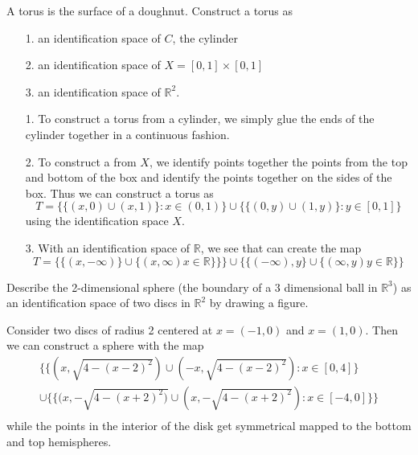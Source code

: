 \documentclass[letter,12pt,twoside]{hmcpset}
\begin{document}
\begin{exercise}[Exercise 8.45]
A torus is the surface of a doughnut. Construct a torus as

\begin{itemize}
    \item[1.] an identification space of $C$, the cylinder
    \item[2.] an identification space of $X = [0, 1] \times [0, 1]$
    \item[3.] an identification space of $\mathbb{R}^2$. 
\end{itemize}
\end{exercise}

\begin{solution}
    \begin{itemize}
        \item[1.] To construct a torus from a cylinder, we simply glue the
        ends of the cylinder together in a continuous fashion.
    
        \item[2.] To construct a from $X$, we identify points together the
        points from the top and bottom of the box and identify the points
        together on the sides of the box. Thus we can construct a torus as
        \[
          T =  \Big\{ \{(x, 0) \cup (x, 1)\} : x \in (0, 1)  \Big\}
          \cup\Big\{ \{(0, y) \cup (1, y)\} : y \in [0, 1] \Big\} 
        \]
        using the identification space $X$.
    
        \item[3.] With an identification space of $\mathbb{R}$, we see
        that can create the map
        \[
            T = \Big\{ \{(x, -\infty)\}\cup \{(x,\infty) x \in \mathbb{R}\}\}\Big\}
            \cup \Big\{ \{(-\infty), y\}\cup \{(\infty, y) y \in \mathbb{R}\}\Big\}        
        \] 
    
    
    \end{itemize}
    
\end{solution}

\begin{exercise}[Exercise 8.46]
Describe the 2-dimensional sphere (the boundary of a 3 dimensional
ball in $\mathbb{R}^3$) as an identification space of two discs in
$\mathbb{R}^2$ by drawing a figure.
\end{exercise}

\begin{solution}
    
    Consider two discs of radius 2 centered at $x = (-1, 0)$ and
    $x = (1, 0)$. Then we can construct a sphere with the
    map 
    \begin{align*} 
      \Big\{ \{(x,\sqrt{4 - (x - 2)^2}) \cup (-x, \sqrt{4 - (x - 2)^2}): x \in [0, 4]\}\\ 
      \cup \Big\{ \{(x,-\sqrt{4 - (x + 2)^2)} \cup (x,-\sqrt{4 - (x + 2)^2}): x \in [-4, 0]\} \Big\}\\
    \end{align*}
    while the points in the interior of the disk get symmetrical
    mapped to the bottom and top hemispheres.

\end{solution}
\end{document}
